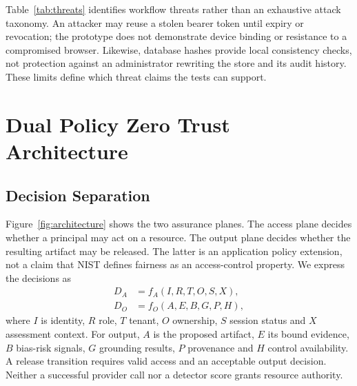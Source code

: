 \documentclass[conference]{IEEEtran}
\begin{document}
Table~\ref{tab:threats} identifies workflow threats rather than an exhaustive attack taxonomy. An attacker may reuse a stolen bearer token until expiry or revocation; the prototype does not demonstrate device binding or resistance to a compromised browser. Likewise, database hashes provide local consistency checks, not protection against an administrator rewriting the store and its audit history. These limits define which threat claims the tests can support.

\section{Dual Policy Zero Trust Architecture}
\subsection{Decision Separation}
Figure~\ref{fig:architecture} shows the two assurance planes. The access plane decides whether a principal may act on a resource. The output plane decides whether the resulting artifact may be released. The latter is an application policy extension, not a claim that NIST defines fairness as an access-control property. We express the decisions as
\begin{align}
D_A &= f_A(I,R,T,O,S,X), \\
D_O &= f_O(A,E,B,G,P,H),
\end{align}
where $I$ is identity, $R$ role, $T$ tenant, $O$ ownership, $S$ session status and $X$ assessment context. For output, $A$ is the proposed artifact, $E$ its bound evidence, $B$ bias-risk signals, $G$ grounding results, $P$ provenance and $H$ control availability. A release transition requires valid access and an acceptable output decision. Neither a successful provider call nor a detector score grants resource authority.
\end{document}
